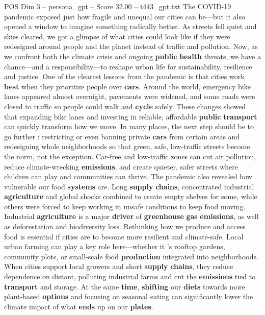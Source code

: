 \begin{textsample}{POS Dim 3 – persona\_gpt – Score 32.00 – t443\_gpt.txt}  \label{ex:f3_pos_025}
The COVID-19 pandemic exposed just how fragile and unequal our cities can be—but it also opened a window to imagine something radically better.
As streets fell quiet and skies cleared, we got a glimpse of what cities could look like if they were redesigned around people and the planet instead of traffic and pollution.
Now, as we confront both the climate crisis and ongoing \textbf{public} \textbf{health} threats, we have a chance—and a responsibility—to reshape urban life for sustainability, resilience and justice.
One of the clearest lessons from the pandemic is that cities work \textbf{best} when they prioritize people over \textbf{cars}.
Around the world, emergency bike lanes appeared almost overnight, pavements were widened, and some roads were closed to traffic so people could walk and \textbf{cycle} safely.
These changes showed that expanding bike lanes and investing in reliable, affordable \textbf{public} \textbf{transport} can quickly transform how we move.
In many places, the next step should be to go further : restricting or even banning private \textbf{cars} from certain areas and redesigning whole neighborhoods so that green, safe, low-traffic streets become the norm, not the exception.
Car-free and low-traffic zones can cut air pollution, reduce climate-wrecking \textbf{emissions}, and create quieter, safer streets where children can play and communities can thrive.
The pandemic also revealed how vulnerable our food \textbf{systems} are.
Long \textbf{supply} \textbf{chains}, concentrated industrial \textbf{agriculture} and global shocks combined to create empty shelves for some, while others were forced to keep working in unsafe conditions to keep food moving.
Industrial \textbf{agriculture} is a major \textbf{driver} of \textbf{greenhouse} \textbf{gas} \textbf{emissions}, as well as deforestation and biodiversity loss.
Rethinking how we produce and access food is essential if cities are to become more resilient and climate-safe.
Local urban farming can play a key role here—whether it ’s rooftop gardens, community plots, or small-scale food \textbf{production} integrated into neighborhoods.
When cities support local growers and short \textbf{supply} \textbf{chains}, they reduce dependence on distant, polluting industrial farms and cut the \textbf{emissions} tied to \textbf{transport} and storage.
At the same \textbf{time}, \textbf{shifting} our \textbf{diets} towards more plant-based \textbf{options} and focusing on seasonal eating can significantly lower the climate impact of what \textbf{ends} up on our \textbf{plates}.

\end{textsample}
